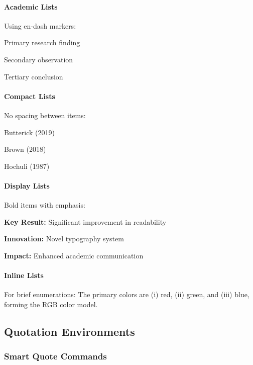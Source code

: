 \paragraph{Academic Lists} Using en-dash markers:
\begin{academicitem}
\item Primary research finding
\item Secondary observation
\item Tertiary conclusion
\end{academicitem}

\paragraph{Compact Lists}
No spacing between items:
\begin{compactitem}
\item Butterick (2019)
\item Brown (2018)
\item Hochuli (1987)
\end{compactitem}

\paragraph{Display Lists}
Bold items with emphasis:
\begin{displayitem}
\item \textbf{Key Result:} Significant improvement in readability
\item \textbf{Innovation:} Novel typography system
\item \textbf{Impact:} Enhanced academic communication
\end{displayitem}

\paragraph{Inline Lists}
For brief enumerations:
The primary colors are (i) red, (ii) green, and (iii) blue, forming the RGB color model.

\subsection{Quotation Environments}

\subsubsection{Smart Quote Commands}

